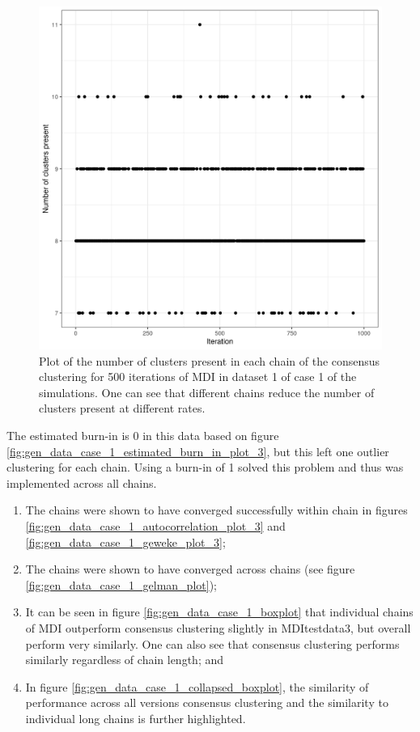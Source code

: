 \documentclass[14pt]{extarticle} %
\begin{document}
	\begin{figure}[!htb]
		\centering
		\includegraphics[scale=0.65]{Images/Gen_data/Case_1/Number_clusters_present_MDItestdata1_consensus_500.png}
		\caption{Plot of the number of clusters present in each chain of the consensus clustering for 500 iterations of MDI in dataset 1 of case 1 of the simulations. One can see that different chains reduce the number of clusters present at different rates.}
		\label{fig:gen_data_case_1_num_clusters_present_con_500}
	\end{figure}

	The estimated burn-in is 0 in this data based on figure \ref{fig:gen_data_case_1_estimated_burn_in_plot_3}, but this left one outlier clustering for each chain. Using a burn-in of 1 solved this problem and thus was implemented across all chains.
	
	\begin{enumerate}
		\item The chains were shown to have converged successfully within chain in figures \ref{fig:gen_data_case_1_autocorrelation_plot_3} and \ref{fig:gen_data_case_1_geweke_plot_3};
		\item The chains were shown to have converged across chains (see figure \ref{fig:gen_data_case_1_gelman_plot});
		\item It can be seen in figure \ref{fig:gen_data_case_1_boxplot} that individual chains of MDI outperform consensus clustering slightly in MDItestdata3, but overall perform very similarly. One can also see that consensus clustering performs similarly regardless of chain length; and
		\item In figure \ref{fig:gen_data_case_1_collapsed_boxplot}, the similarity of performance across all versions consensus clustering and the similarity to individual long chains is further highlighted.
	\end{enumerate}
	
\end{document}
